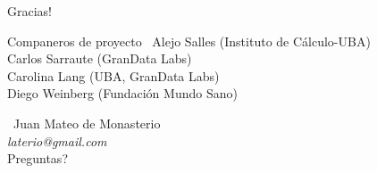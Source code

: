 \documentclass[xcolor=x11names]{beamer}
\begin{document}










\begin{frame}{Gracias! }
			\begin{block}{Companeros de proyecto}
					\center\
					Alejo Salles (Instituto de Cálculo-UBA) \\
					Carlos Sarraute (GranData Labs) \\
					Carolina Lang (UBA, GranData Labs) \\
					 Diego Weinberg (Fundación Mundo Sano) \\
	\end{block}

				\center\
				Juan Mateo de Monasterio \\
				\textit{laterio@gmail.com} \\
				Preguntas? \\

\end{frame}




\justifying%
% 
% 


\vfill
\end{document}
